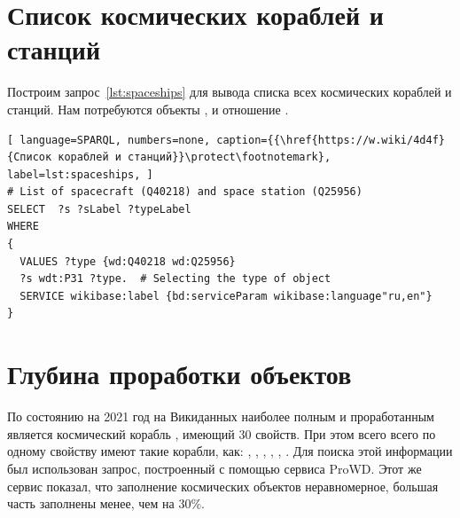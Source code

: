 \section{Список космических кораблей и станций}

Построим запрос~\ref{lst:spaceships} для вывода списка всех космических кораблей и станций. 
Нам потребуются объекты , 
 и отношение . 

\begin{lstlisting}[ language=SPARQL, numbers=none, caption={{\href{https://w.wiki/4d4f}{Список кораблей и станций}}\protect\footnotemark}, label=lst:spaceships, ]
# List of spacecraft (Q40218) and space station (Q25956)
SELECT  ?s ?sLabel ?typeLabel
WHERE
{
  VALUES ?type {wd:Q40218 wd:Q25956}
  ?s wdt:P31 ?type.  # Selecting the type of object
  SERVICE wikibase:label {bd:serviceParam wikibase:language"ru,en"}
}
\end{lstlisting}


\section{Глубина проработки объектов}

По состоянию на 2021 год на Викиданных 
наиболее полным и проработанным является космический корабль 
, 
имеющий 30 свойств\autocite{spacecraftProWD}. 
При этом всего всего по одному свойству имеют такие корабли, как: 
, 
, 
, 
, 
, 
\autocite{spacecraftProWD}. 
Для поиска этой информации был использован запрос, построенный с помощью сервиса ProWD\autocite{spacecraftProWD}. 
Этот же сервис показал, что заполнение космических объектов неравномерное, 
большая часть заполнены менее, чем на 30\%\autocite{spacecraftProWD}. 


